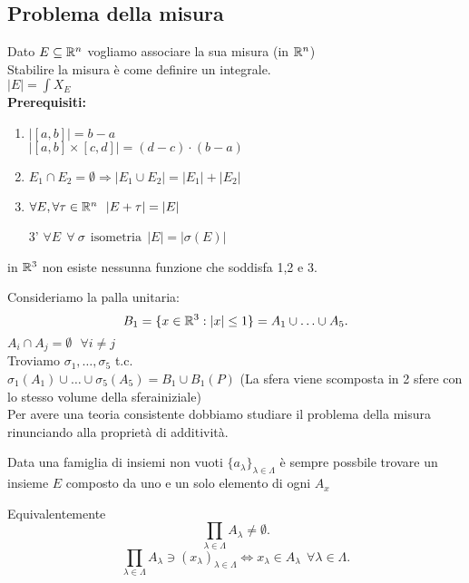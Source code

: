\documentclass[12px]{article}
\begin{document}
 \subsection{Problema della misura} 
 Dato $E\subseteq\mathbb{R}^n$ vogliamo associare la sua misura (in $\mathbb{R}^n$)\\
 Stabilire la misura è come definire un integrale.\\
  $|E| = \int X_E$\\
  \textbf{Prerequisiti:}\\
  \begin{enumerate}
\item$ |[a,b]| = b-a$\\
$|[a,b]\times[c,d]| = (d-c) \cdot (b-a)$
 \item$ E_1\cap E_2 = \emptyset \Rightarrow |E_1\cup E_2| = |E_1| + |E_2|$
 \item $\forall E, \forall \tau\in\R^n \ \ |E+\tau| = |E|$
 \item[3'] $\forall E \ \ \forall \ \sigma \ \ \text{isometria} \ \ |E| = |\sigma(E)|$
  \end{enumerate}
  \begin{teo}
  	in $\mathbb{R}^3$ non esiste nessunna funzione che soddisfa 1,2 e 3.
  \end{teo}
  Consideriamo la palla unitaria:
  \[
	  B_1 = \{x\in\mathbb{R}^3 : |x|\leq 1\} = A_1\cup\ldots\cup A_5
  .\]  
  $A_i\cap A_j = \emptyset \ \ \ \forall i\neq j$ \\
  Troviamo $\sigma_1,\ldots,\sigma_5$ t.c.\\
  $\sigma_1(A_1)\cup\ldots\cup\sigma_5(A_5) = B_1\cup B_1(P)$ (La sfera viene scomposta in 2 sfere con lo stesso volume della sferainiziale)\\
  Per avere una teoria consistente dobbiamo studiare il  problema della misura rinunciando alla proprietà di additività.\\
  \begin{ass}
	  Data una famiglia di insiemi non vuoti $\{a_\lambda\}_{\lambda\in\Lambda}$ è sempre possbile trovare un insieme $E$ composto da uno e un solo elemento di ogni $A_x$
  \end{ass}
  Equivalentemente
  \[
	  \prod_{\lambda\in\Lambda} A_\lambda \neq \emptyset
  .\] 
  \[
	   \prod_{\lambda\in\Lambda} A_\lambda\ni(x_\lambda)_{\lambda\in\Lambda} \Leftrightarrow x_\lambda\in A_\lambda \ \ \forall \lambda\in\Lambda
  .\] 





	
\end{document}
